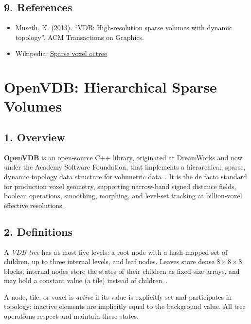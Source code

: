 \subsection{9. References}
\begin{itemize}
    \item Museth, K. (2013). ``VDB: High-resolution sparse volumes with dynamic topology''. ACM Transactions on Graphics.
    \item Wikipedia: \href{https://en.wikipedia.org/wiki/Sparse_voxel_octree}{Sparse voxel octree}
\end{itemize}

\section{OpenVDB: Hierarchical Sparse Volumes}
\label{sec:openvdb}

\subsection{1. Overview}
\textbf{OpenVDB} is an open-source C++ library, originated at
DreamWorks and now under the Academy Software Foundation, that implements a
hierarchical, sparse, dynamic topology data structure for volumetric
data~\cite{museth2013}. It is the de facto standard for production voxel
geometry, supporting narrow-band signed distance fields, boolean operations,
smoothing, morphing, and level-set tracking at billion-voxel effective
resolutions.

\subsection{2. Definitions}

\begin{definition}\label{def:vdb_tree}
A \emph{VDB tree} has at most five levels: a root node with a hash-mapped set
of children, up to three internal levels, and leaf nodes. Leaves store dense
$8 \times 8 \times 8$ blocks; internal nodes store the states of their
children as fixed-size arrays, and may hold a constant value (a tile) instead
of children~\cite{museth2013}.
\end{definition}

\begin{definition}\label{def:vdb_active}
A node, tile, or voxel is \emph{active} if its value is explicitly set and
participates in topology; inactive elements are implicitly equal to the
background value. All tree operations respect and maintain these states.
\end{definition}

